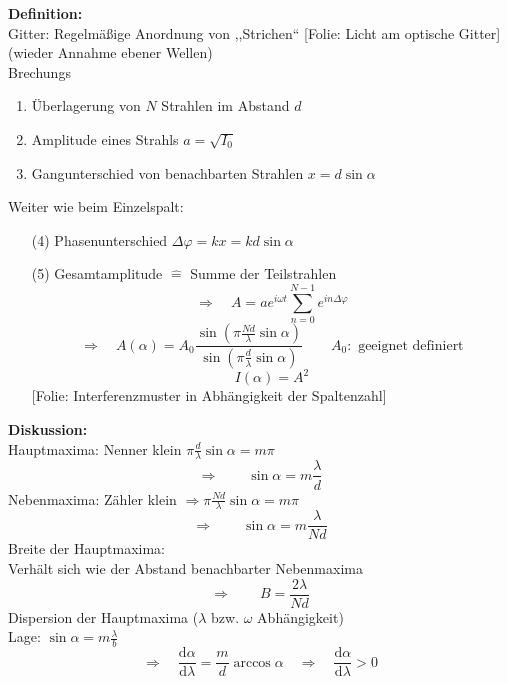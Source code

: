 \documentclass[titlepage,11pt,a4paper,ngerman]{report}
\newcommand{\tx}[1]{\textrm{#1}}
\newcommand{\dd}{\tx{d}}
\newcommand{\folie}[1]{\color{gray}[Folie: #1]\color{black}}
\begin{document}
\textbf{Definition:}\\
Gitter: Regelmäßige Anordnung von ,,Strichen``
\folie{Licht am optische Gitter} (wieder Annahme ebener Wellen)\\
Brechungs
\begin{enumerate}[(1)]
	\item Überlagerung von $ N $ Strahlen im Abstand $ d $
	\item Amplitude eines Strahls $ a = \sqrt{I_0} $
	\item Gangunterschied von benachbarten Strahlen $ x = d \sin \alpha $
\end{enumerate}	
Weiter wie beim Einzelspalt:
\begin{enumerate}[(4)]
	\item[(4)] Phasenunterschied $ \Delta \varphi = k x = k d \sin \alpha $
	\item[(5)] Gesamtamplitude $ \widehat{=} $ Summe der Teilstrahlen
	\begin{equation*}
	\Rightarrow \quad A = a e^{i \omega t} \sum_{n=0}^{N-1} e^{i n \Delta \varphi}
	\end{equation*}
	\begin{equation*}
	\Rightarrow \quad A(\alpha) = A_0 \frac{\sin \left(\pi \frac{N d}{\lambda} \sin \alpha \right)}{\sin \left( \pi \frac{d}{\lambda} \sin \alpha \right)} \qquad A_0: \tx{ geeignet definiert}
	\end{equation*}
	\begin{equation*}
	I(\alpha) = A^2
	\end{equation*}
	\folie{Interferenzmuster in Abhängigkeit der Spaltenzahl}
\end{enumerate}
\textbf{Diskussion:}\\[5pt]
Hauptmaxima: Nenner klein $ \pi \frac{d}{\lambda} \sin \alpha = m \pi $
\begin{equation*}
\Rightarrow \qquad \sin \alpha = m \frac{\lambda}{d}
\end{equation*}
Nebenmaxima: Zähler klein $ \Rightarrow \pi \frac{N d}{\lambda} \sin \alpha = m \pi $
\begin{equation*}
\Rightarrow \qquad \sin \alpha = m \frac{\lambda}{N d}
\end{equation*}
Breite der Hauptmaxima:\\
Verhält sich wie der Abstand benachbarter Nebenmaxima
\begin{equation*}
\Rightarrow \qquad B = \frac{2 \lambda}{N d}
\end{equation*}
Dispersion der Hauptmaxima ($ \lambda $ bzw. $ \omega $ Abhängigkeit)\\
Lage: $ \sin \alpha = m \frac{\lambda}{b} $
\begin{equation*}
\Rightarrow \quad \frac{\dd \alpha}{\dd \lambda} = \frac{m}{d} \arccos \alpha \quad \Rightarrow \quad \frac{\dd \alpha}{\dd \lambda} > 0
\end{equation*}
\end{document}
